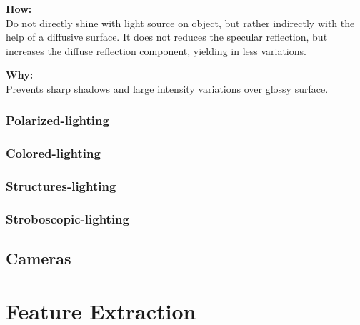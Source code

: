 \documentclass[a4paper, fontsize=8pt, landscape, DIV=1]{scrartcl}
\begin{document}
\begin{multicols*}{4}
		\textbf{How:}\\
		Do not directly shine with light source on object, but rather indirectly with the help of a diffusive surface. It does not reduces the specular reflection, but increases the diffuse reflection component, yielding in less variations.
		\par 
		\textbf{Why:}\\
		Prevents sharp shadows and large intensity variations over glossy surface.  
	
		\subsubsection{Polarized-lighting}
		\subsubsection{Colored-lighting}
		\subsubsection{Structures-lighting}
		\subsubsection{Stroboscopic-lighting}
		
		\subsection{Cameras}
		
		\section{Feature Extraction}	
	
		 
		
	\end{multicols*}
	\setcounter{secnumdepth}{3}
\end{document}
